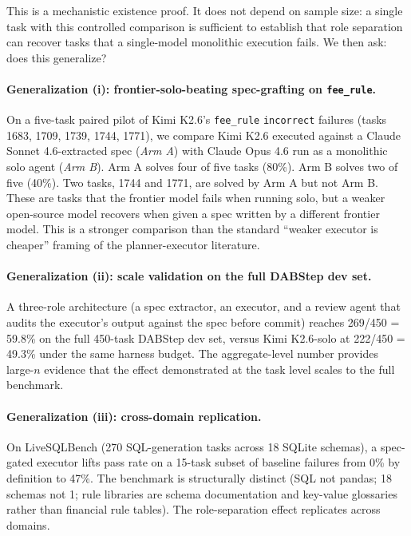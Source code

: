 \documentclass[conference]{IEEEtran}
\newcommand{\Kimi}{Kimi K2.6}
\newcommand{\Opus}{Claude Opus 4.6}
\newcommand{\Sonnet}{Claude Sonnet 4.6}
\begin{document}
This is a mechanistic existence proof. It does not depend on sample size: a single task with this controlled comparison is sufficient to establish that role separation can recover tasks that a single-model monolithic execution fails. We then ask: does this generalize?

\paragraph{Generalization (i): frontier-solo-beating spec-grafting on \texttt{fee\_rule}.}
On a five-task paired pilot of \Kimi{}'s \texttt{fee\_rule} \texttt{incorrect} failures (tasks 1683, 1709, 1739, 1744, 1771), we compare \Kimi{} executed against a \Sonnet{}-extracted spec (\emph{Arm A}) with \Opus{} run as a monolithic solo agent (\emph{Arm B}). Arm A solves four of five tasks (80\%). Arm B solves two of five (40\%). Two tasks, 1744 and 1771, are solved by Arm A but not Arm B. These are tasks that the frontier model fails when running solo, but a weaker open-source model recovers when given a spec written by a different frontier model. This is a stronger comparison than the standard ``weaker executor is cheaper'' framing of the planner-executor literature.

\paragraph{Generalization (ii): scale validation on the full DABStep dev set.}
A three-role architecture (a spec extractor, an executor, and a review agent that audits the executor's output against the spec before commit) reaches 269/450 = 59.8\% on the full 450-task DABStep dev set, versus \Kimi{}-solo at 222/450 = 49.3\% under the same harness budget. The aggregate-level number provides large-$n$ evidence that the effect demonstrated at the task level scales to the full benchmark.

\paragraph{Generalization (iii): cross-domain replication.}
On LiveSQLBench (270 SQL-generation tasks across 18 SQLite schemas), a spec-gated executor lifts pass rate on a 15-task subset of baseline failures from 0\% by definition to 47\%. The benchmark is structurally distinct (SQL not pandas; 18 schemas not 1; rule libraries are schema documentation and key-value glossaries rather than financial rule tables). The role-separation effect replicates across domains.
\end{document}
